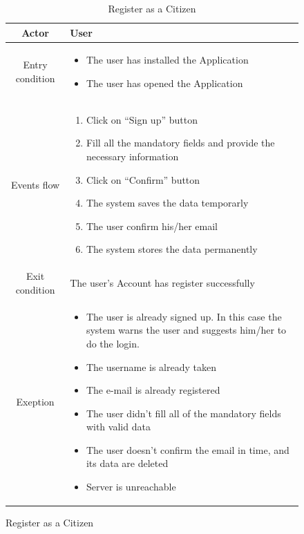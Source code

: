 \documentclass{article}
\begin{document}
	\begin{figure}[H]
	
		\begin{table} [H]
		\begin{center}
		\caption{Register as a Citizen}
		\begin{tabular}{|c|p{8cm}|}
			\hline
			Actor			&	User\\
			\hline
			Entry condition	&	\begin{itemize}[noitemsep,topsep=0pt]
									\item The user has installed the Application
									\item The user has opened the Application
								\end{itemize}\\
			\hline
			Events flow 		& 	\begin{enumerate}[noitemsep,topsep=0pt]
									\item Click on “Sign up” button
									\item Fill all the mandatory fields and provide the
									 necessary information
									\item Click on “Confirm” button
									\item The system saves the data temporarly
									\item The user confirm his/her email
									\item The system stores the data permanently
								\end{enumerate}\\
			\hline
			Exit condition	& 	The user's Account has register successfully\\
			\hline
			Exeption 		& 	\begin{itemize}[noitemsep,topsep=0pt]
									\item The user is already signed up.
									In this case the system warns the user and suggests
									 him/her to do the login.
									\item The username is already taken
									\item The e-mail is already registered
									\item The user didn’t fill all of the mandatory fields 
									with valid data
									\item The user doesn't confirm the email in time, 
									and its data are deleted
									\item Server is unreachable
								\end{itemize}\\
			\hline
		\end{tabular}	
		\end{center}
		\end{table} 
	

\end{figure}
\end{document}
